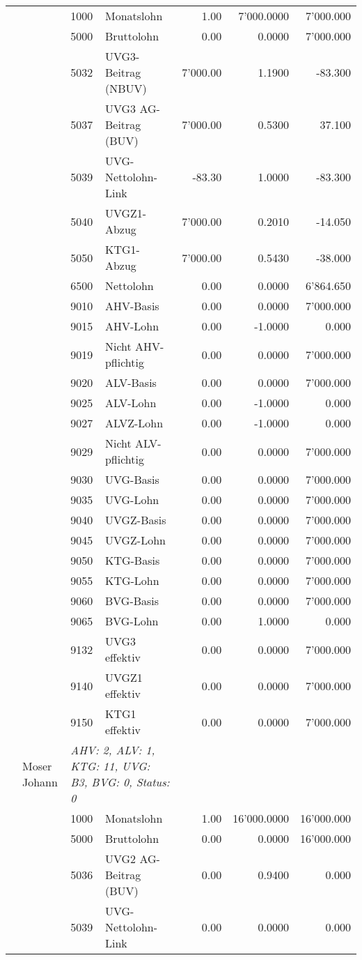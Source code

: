 \documentclass[15pt,a4paper]{article}
\begin{document}
\begin{longtable}{@{\extracolsep{\fill}}l l l l|r|r|r}
&&1000&Monatslohn&1.00&7'000.0000&7'000.000\\
&&5000&Bruttolohn&0.00&0.0000&7'000.000\\
&&5032&UVG3-Beitrag (NBUV)&7'000.00&1.1900&-83.300\\
&&5037&UVG3 AG-Beitrag (BUV)&7'000.00&0.5300&37.100\\
&&5039&UVG-Nettolohn-Link&-83.30&1.0000&-83.300\\
&&5040&UVGZ1-Abzug&7'000.00&0.2010&-14.050\\
&&5050&KTG1-Abzug&7'000.00&0.5430&-38.000\\
&&6500&Nettolohn&0.00&0.0000&6'864.650\\
&&9010&AHV-Basis&0.00&0.0000&7'000.000\\
&&9015&AHV-Lohn&0.00&-1.0000&0.000\\
&&9019&Nicht AHV-pflichtig&0.00&0.0000&7'000.000\\
&&9020&ALV-Basis&0.00&0.0000&7'000.000\\
&&9025&ALV-Lohn&0.00&-1.0000&0.000\\
&&9027&ALVZ-Lohn&0.00&-1.0000&0.000\\
&&9029&Nicht ALV-pflichtig&0.00&0.0000&7'000.000\\
&&9030&UVG-Basis&0.00&0.0000&7'000.000\\
&&9035&UVG-Lohn&0.00&0.0000&7'000.000\\
&&9040&UVGZ-Basis&0.00&0.0000&7'000.000\\
&&9045&UVGZ-Lohn&0.00&0.0000&7'000.000\\
&&9050&KTG-Basis&0.00&0.0000&7'000.000\\
&&9055&KTG-Lohn&0.00&0.0000&7'000.000\\
&&9060&BVG-Basis&0.00&0.0000&7'000.000\\
&&9065&BVG-Lohn&0.00&1.0000&0.000\\
&&9132&UVG3 effektiv&0.00&0.0000&7'000.000\\
&&9140&UVGZ1 effektiv&0.00&0.0000&7'000.000\\
&&9150&KTG1 effektiv&0.00&0.0000&7'000.000\\
\pagebreak
26&Moser Johann&\multicolumn{2}{l|}{\small\emph{AHV: 2, ALV: 1, KTG: 11, UVG: B3, BVG: 0, Status: 0}}&& \\
&&1000&Monatslohn&1.00&16'000.0000&16'000.000\\
&&5000&Bruttolohn&0.00&0.0000&16'000.000\\
&&5036&UVG2 AG-Beitrag (BUV)&0.00&0.9400&0.000\\
&&5039&UVG-Nettolohn-Link&0.00&0.0000&0.000\\

\end{longtable}
\end{document}
